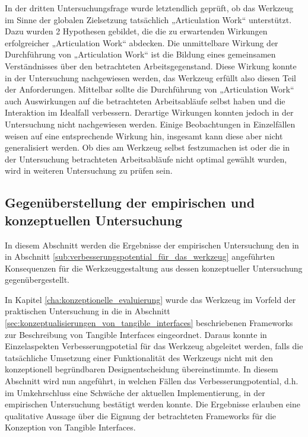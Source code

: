 In der dritten Untersuchungsfrage wurde letztendlich geprüft, ob das Werkzeug im Sinne der globalen Zielsetzung tatsächlich „Articulation Work“ unterstützt. Dazu wurden 2 Hypothesen gebildet, die die zu erwartenden Wirkungen erfolgreicher „Articulation Work“ abdecken. Die unmittelbare Wirkung der Durchführung von „Articulation Work“ ist die Bildung eines gemeinsamen Verständnisses über den betrachteten Arbeitsgegenstand. Diese Wirkung konnte in der Untersuchung nachgewiesen werden, das Werkzeug erfüllt also diesen Teil der Anforderungen. Mittelbar sollte die Durchführung von „Articulation Work“ auch Auswirkungen auf die betrachteten Arbeitsabläufe selbst haben und die Interaktion im Idealfall verbessern. Derartige Wirkungen konnten jedoch in der Untersuchung nicht nachgewiesen werden. Einige Beobachtungen in Einzelfällen weisen auf eine entsprechende Wirkung hin, insgesamt kann diese aber nicht generalisiert werden. Ob dies am Werkzeug selbst festzumachen ist oder die in der Untersuchung betrachteten Arbeitsabläufe nicht optimal gewählt wurden, wird in weiteren Untersuchung zu prüfen sein.

\subsection{Gegenüberstellung der empirischen und konzeptuellen Untersuchung}
\label{sub:gegenüberstellung}

In diesem Abschnitt werden die Ergebnisse der empirischen Untersuchung den in in Abschnitt \ref{sub:verbesserungspotential_für_das_werkzeug} angeführten Konsequenzen für die Werkzeuggestaltung aus dessen konzeptueller Untersuchung gegenübergestellt.

In Kapitel \ref{cha:konzeptionelle_evaluierung} wurde das Werkzeug im Vorfeld der praktischen Untersuchung in die in Abschnitt \ref{sec:konzeptualisierungen_von_tangible_interfaces} beschriebenen Frameworks zur Beschreibung von Tangible Interfaces eingeordnet. Daraus konnte in Einzelaspekten Verbesserungpotetial für das Werkzeug abgeleitet werden, falls die tatsächliche Umsetzung einer Funktionalität des Werkzeugs nicht mit den konzeptionell begründbaren Designentscheidung übereinstimmte. In diesem Abschnitt wird nun angeführt, in welchen Fällen das Verbesserungpotential, d.h. im Umkehrschluss eine Schwäche der aktuellen Implementierung, in der empirischen Untersuchung bestätigt werden konnte. Die Ergebnisse erlauben eine qualitative Aussage über die Eignung der betrachteten Frameworks für die Konzeption von Tangible Interfaces.


